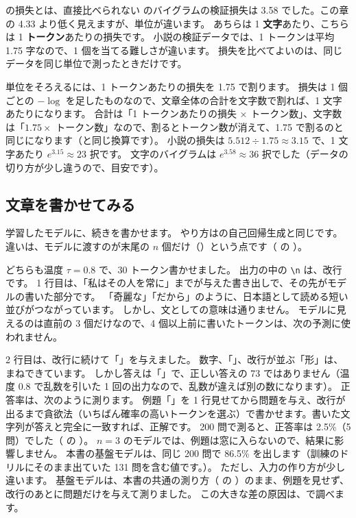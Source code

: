 \begin{caution}{の損失とは、直接比べられない}
のバイグラムの検証損失は 3.58 でした。この章の 4.33 より低く見えますが、単位が違います。
あちらは 1 \textbf{文字}あたり、こちらは 1 \textbf{トークン}あたりの損失です。
小説の検証データでは、1 トークンは平均 1.75 字なので、1 個を当てる難しさが違います。
損失を比べてよいのは、同じデータを同じ単位で測ったときだけです。

単位をそろえるには、1 トークンあたりの損失を 1.75 で割ります。
損失は 1 個ごとの $-\log$ を足したものなので、文章全体の合計を文字数で割れば、1 文字あたりになります。
合計は「1 トークンあたりの損失 $\times$ トークン数」、文字数は「$1.75\times$ トークン数」なので、割るとトークン数が消えて、1.75 で割るのと同じになります（と同じ換算です）。
小説の損失は $5.512\div1.75\approx3.15$ で、1 文字あたり $e^{3.15}\approx23$ 択です。
文字のバイグラムは $e^{3.58}\approx36$ 択でした（データの切り方が少し違うので、目安です）。
\end{caution}

\subsection*{文章を書かせてみる}

学習したモデルに、続きを書かせます。
やり方はの自己回帰生成と同じです。
違いは、モデルに渡すのが末尾の $n$ 個だけ（）という点です（ の ）。


どちらも温度 $\tau=0.8$ で、30 トークン書かせました。
出力の中の \texttt{\textbackslash n} は、改行です。
1 行目は、「私はその人を常に」までが与えた書き出しで、その先がモデルの書いた部分です。
「奇麗な」「だから」のように、日本語として読める短い並びがつながっています。
しかし、文としての意味は通りません。
モデルに見えるのは直前の 3 個だけなので、4 個以上前に書いたトークンは、次の予測に使われません。

2 行目は、改行に続けて「」を与えました。
数字、「\code{=}」、改行が並ぶ「形」は、まねできています。
しかし答えは「」で、正しい答えの 73 ではありません（温度 0.8 で乱数を引いた 1 回の出力なので、乱数が違えば別の数になります）。
正答率は、次のように測ります。
例題「」を 1 行見せてから問題を与え、改行が出るまで貪欲法（いちばん確率の高いトークンを選ぶ）で書かせます。書いた文字列が答えと完全に一致すれば、正解です。
200 問で測ると、正答率は 2.5\%（5 問）でした（ の ）。
$n=3$ のモデルでは、例題は窓に入らないので、結果に影響しません。
本書の基盤モデルは、同じ 200 問で 86.5\% を出します（訓練のドリルにそのまま出ていた 131 問を含む値です。）。
ただし、入力の作り方が少し違います。
基盤モデルは、本書の共通の測り方（ の ）のまま、例題を見せず、改行のあとに問題だけを与えて測りました。
この大きな差の原因は、で調べます。

